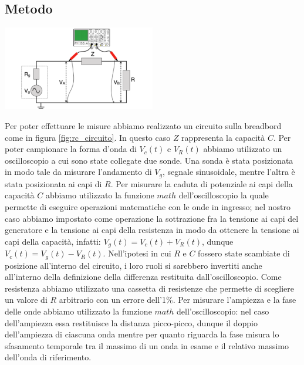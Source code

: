 \documentclass[a4paper]{article}
\begin{document}
\subsection{Metodo}
\begin{center}
	\includegraphics[width=0.5\textwidth]{grafici/circuito-rc.png}
	\label{fig:rc_circuito}
\end{center}
Per poter effettuare le misure abbiamo realizzato un circuito sulla breadbord come in figura \ref{fig:rc_circuito}. In questo caso $Z$ rappresenta la capacità $C$. Per poter campionare la forma d'onda di $V_c (t)$ e $V_R (t)$ abbiamo utilizzato un oscilloscopio a cui sono state collegate due sonde. Una sonda è stata posizionata in modo tale da misurare l'andamento di $V_g$, segnale sinusoidale, mentre l'altra è stata posizionata ai capi di $R$. Per misurare la caduta di potenziale ai capi della capacità $C$ abbiamo utilizzato la funzione $math$ dell'oscilloscopio la quale permette di eseguire operazioni matematiche con le onde in ingresso; nel nostro caso abbiamo impostato come operazione la sottrazione fra la tensione ai capi del generatore e la tensione ai capi della resistenza in modo da ottenere la tensione ai capi della capacità, infatti:
$V_g(t)=V_c(t)+V_R(t)$, dunque $V_c(t)=V_g(t)-V_R(t)$. Nell'ipotesi in cui $R$ e $C$ fossero state scambiate di posizione all'interno del circuito, i loro ruoli si sarebbero invertiti anche all'interno della definizione della differenza restituita dall'oscilloscopio.
Come resistenza abbiamo utilizzato una cassetta di resistenze che permette di scegliere un valore di $R$ arbitrario con un errore dell'1\%. Per misurare l'ampiezza e la fase delle onde abbiamo utilizzato la funzione $math$ dell'oscilloscopio: nel caso dell'ampiezza essa restituisce la distanza picco-picco, dunque il doppio dell'ampiezza di ciascuna onda mentre per quanto riguarda la fase misura lo sfasamento temporale tra il massimo di un onda in esame e il relativo massimo dell'onda di riferimento.
\end{document}
